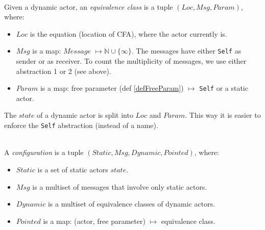 \documentclass[a4paper]{report}
\numberwithin{algorithm}{chapter}
\begin{document}
\begin{define} \mbox{}\\
Given a dynamic actor, an \emph{equivalence class} is a tuple $(\mathit{Loc}, \mathit{Msg}, \mathit{Param})$, where:
\begin{itemize}
\item $\mathit{Loc}$ is the equation (location of CFA), where the actor currently is.
\item $\mathit{Msg}$ is a map: $\mathit{Message}$ $\mapsto \mathbb{N} \cup \{\infty\}$.
The messages have either \texttt{Self} as sender or as receiver.
To count the multiplicity of messages, we use either abstraction 1 or 2 (see above).
\item $\mathit{Param}$ is a map: free parameter (def \ref{defFreeParam}) $\mapsto$ \texttt{Self} or a static actor.
\end{itemize}
\end{define}

\begin{rem}
The $\mathit{state}$ of a dynamic actor is split into $\mathit{Loc}$ and $\mathit{Param}$.
This way it is easier to enforce the \texttt{Self} abstraction (instead of a name).
\end{rem}

\begin{define}[Configuration] \mbox{}\\
A \emph{configuration} is a tuple $(\mathit{Static}, \mathit{Msg}, \mathit{Dynamic}, \mathit{Pointed})$, where:
\begin{itemize}
\item $\mathit{Static}$ is a set of static actors $\mathit{state}$.
\item $\mathit{Msg}$ is a multiset of messages that involve only static actors.
\item $\mathit{Dynamic}$ is a multiset of equivalence classes of dynamic actors.
\item $\mathit{Pointed}$ is a map: (actor, free parameter) $\mapsto$ equivalence class.
\end{itemize}
\end{define}
\end{document}
